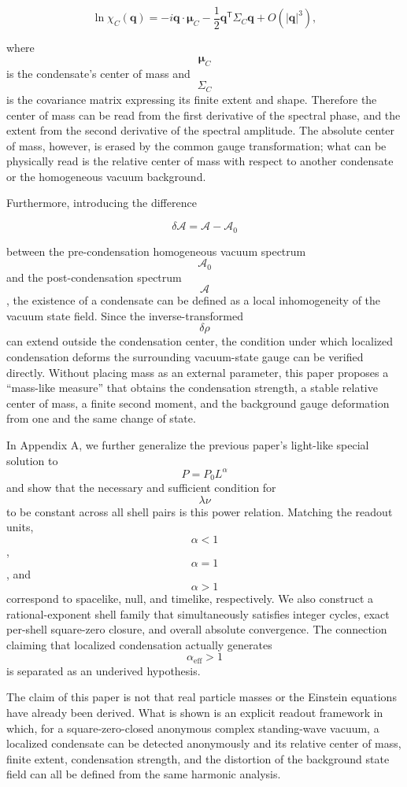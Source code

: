 \documentclass[
  a4paper,
]{article}
\begin{document}
\[
\ln\chi_C(\mathbf q)
=
-i\mathbf q\cdot\boldsymbol\mu_C
-\frac12
\mathbf q^{\mathsf T}\Sigma_C\mathbf q
+O(|\mathbf q|^3),
\]

where \[\boldsymbol\mu_C\] is the condensate's center of mass and
\[\Sigma_C\] is the covariance matrix expressing its finite extent and
shape. Therefore the center of mass can be read from the first
derivative of the spectral phase, and the extent from the second
derivative of the spectral amplitude. The absolute center of mass,
however, is erased by the common gauge transformation; what can be
physically read is the relative center of mass with respect to another
condensate or the homogeneous vacuum background.

Furthermore, introducing the difference

\[
\delta\mathcal A
=
\mathcal A-\mathcal A_0
\]

between the pre-condensation homogeneous vacuum spectrum
\[\mathcal A_0\] and the post-condensation spectrum \[\mathcal A\], the
existence of a condensate can be defined as a local inhomogeneity of the
vacuum state field. Since the inverse-transformed \[\delta\rho\] can
extend outside the condensation center, the condition under which
localized condensation deforms the surrounding vacuum-state gauge can be
verified directly. Without placing mass as an external parameter, this
paper proposes a ``mass-like measure'' that obtains the condensation
strength, a stable relative center of mass, a finite second moment, and
the background gauge deformation from one and the same change of state.

In Appendix A, we further generalize the previous paper's light-like
special solution to \[P=P_0L^\alpha\] and show that the necessary and
sufficient condition for \[\lambda\nu\] to be constant across all shell
pairs is this power relation. Matching the readout units, \[\alpha<1\],
\[\alpha=1\], and \[\alpha>1\] correspond to spacelike, null, and
timelike, respectively. We also construct a rational-exponent shell
family that simultaneously satisfies integer cycles, exact per-shell
square-zero closure, and overall absolute convergence. The connection
claiming that localized condensation actually generates
\[\alpha_{\mathrm{eff}}>1\] is separated as an underived hypothesis.

The claim of this paper is not that real particle masses or the Einstein
equations have already been derived. What is shown is an explicit
readout framework in which, for a square-zero-closed anonymous complex
standing-wave vacuum, a localized condensate can be detected anonymously
and its relative center of mass, finite extent, condensation strength,
and the distortion of the background state field can all be defined from
the same harmonic analysis.
\end{document}

